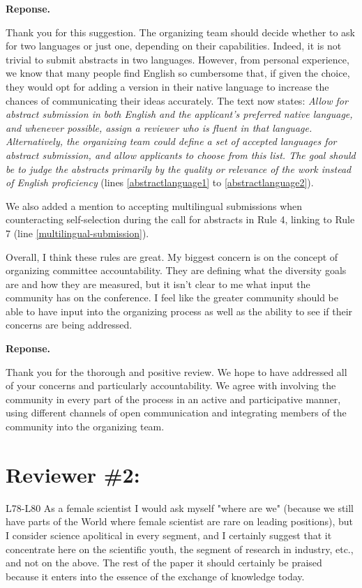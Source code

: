 \documentclass{article}
\newenvironment{Reply}{\noindent\color{BlueViolet}\textbf{Reponse.}}{\vspace{1em}}
\begin{document}
\begin{Reply}

    Thank you for this suggestion. 
    The organizing team should decide whether to ask for two languages or just one, depending on their capabilities. 
    Indeed, it is not trivial to submit abstracts in two languages. However, from personal experience, we know that many people find English so cumbersome that, if given the choice, they would opt for adding a version in their native language to increase the chances of communicating their ideas accurately. 
    The text now states: 
    \textit{Allow for abstract submission in both English and the applicant's preferred native language, and whenever possible, assign a reviewer who is fluent in that language. 
    Alternatively, the organizing team could define a set of accepted languages for abstract submission, and allow applicants to choose from this list. 
    The goal should be to judge the abstracts primarily by the quality or relevance of the work instead of English proficiency} (lines \ref{abstractlanguage1} to \ref{abstractlanguage2}).
    
    We also added a mention to accepting multilingual submissions when counteracting self-selection during the call for abstracts in Rule 4, linking to Rule 7 (line \ref{multilingual-submission}).
\end{Reply}

Overall, I think these rules are great. My biggest concern is on the concept of organizing committee accountability. They are defining what the diversity goals are and how they are measured, but it isn't clear to me what input the community has on the conference. I feel like the greater community should be able to have input into the organizing process as well as the ability to see if their concerns are being addressed.


\begin{Reply}

    Thank you for the thorough and positive review. We hope to have addressed all of your concerns and particularly accountability. We agree with involving the community in every part of the process in an active and participative manner, using different channels of open communication and integrating members of the community into the organizing team. 
\end{Reply}


\section*{Reviewer \#2:}
L78-L80 As a female scientist I would ask myself "where are we" (because we still have parts of the World where female scientist are rare on leading positions), but I consider science apolitical in every segment, and I certainly suggest that it concentrate here on the scientific youth, the segment of research in industry, etc., and not on the above.
The rest of the paper it should certainly be praised because it enters into the essence of the exchange of knowledge today.
\end{document}

